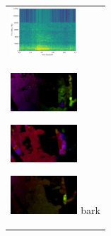 \begin{figure}[H]
\begin{tabular}{l}
\begin{minipage}{0.165\hsize}
\begin{center}
        \end{center}
      \end{minipage}
      \begin{minipage}{0.165\hsize}
        \begin{center}
          \includegraphics[clip, width=2.5cm]{./Figures/sound_bark.eps}
        \end{center}
      \end{minipage}
\\  %
      \begin{minipage}{0.165\hsize}
        \begin{center}
          \includegraphics[clip, width=2.5cm]{./Figures/optic_bark1.eps}
          \hspace{0.3cm} { }
        \end{center}
      \end{minipage}
      \begin{minipage}{0.165\hsize}
        \begin{center}
          \includegraphics[clip, width=2.5cm]{./Figures/optic_bark2.eps}
          \hspace{0.0cm} { }
        \end{center}
      \end{minipage}
      \begin{minipage}{0.165\hsize}
        \begin{center}
          \includegraphics[clip, width=2.5cm]{./Figures/optic_bark3.eps}
          \hspace{0.0cm} {bark}
        \end{center}
      \end{minipage}
      \begin{minipage}{0.165\hsize}

\end{minipage}
\end{tabular}
\end{figure}
